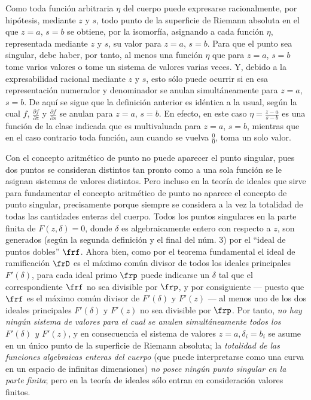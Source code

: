 \documentclass[11pt]{article}
\begin{document}
Como toda función arbitraria \(\eta\) del cuerpo puede expresarse racionalmente, por hipótesis, mediante \(z\) y \(s\), todo punto de la superficie de Riemann absoluta en el que \(z=a\), \(s=b\) se obtiene, por la isomorfía, asignando a cada función \(\eta\), representada mediante \(z\) y \(s\), su valor para \(z=a\), \(s=b\). Para que el punto sea singular, debe haber, por tanto, al menos una función \(\eta\) que para \(z=a\), \(s=b\) tome varios valores o tome un sistema de valores varias veces. Y, debido a la expresabilidad racional mediante \(z\) y \(s\), esto sólo puede ocurrir si en esa representación numerador y denominador se anulan simultáneamente para \(z=a\), \(s=b\). De aquí se sigue que la definición anterior es idéntica a la usual, según la cual \(f\), \(\frac{\partial f}{\partial z}\) y \(\frac{\partial f}{\partial s}\) se anulan para \(z=a\), \(s=b\). En efecto, en este caso \(\eta=\frac{z-a}{s-b}\) es una función de la clase indicada que es multivaluada para \(z=a\), \(s=b\), mientras que en el caso contrario toda función, aun cuando se vuelva \(\frac{0}{0}\), toma un solo valor.

Con el concepto aritmético de punto no puede aparecer el punto singular, pues dos puntos se consideran distintos tan pronto como a una sola función se le asignan sistemas de valores distintos. Pero incluso en la teoría de ideales que sirve para fundamentar el concepto aritmético de punto no aparece el concepto de punto singular, precisamente porque siempre se considera a la vez la totalidad de todas las cantidades enteras del cuerpo. Todos los puntos singulares en la parte finita de \(F(z,\delta)=0\), donde \(\delta\) es algebraicamente entero con respecto a \(z\), son generados (según la segunda definición y el final del núm. 3) por el ``ideal de puntos dobles'' \(\frf\). Ahora bien, como por el teorema fundamental el ideal de ramificación \(\frD\) es el máximo común divisor de todos los ideales principales \(F'(\delta)\), para cada ideal primo \(\frp\) puede indicarse un \(\delta\) tal que el correspondiente \(\frf\) no sea divisible por \(\frp\), y por consiguiente --- puesto que \(\frf\) es el máximo común divisor de \(F'(\delta)\) y \(F'(z)\) --- al menos uno de los dos ideales principales \(F'(\delta)\) y \(F'(z)\) no sea divisible por \(\frp\). Por tanto, \emph{no hay ningún sistema de valores para el cual se anulen simultáneamente todos los \(F'(\delta)\) y \(F'(z)\)}, y en consecuencia el sistema de valores \(z=a,\delta_i=b_i\) se asume en un único punto de la superficie de Riemann absoluta; la \emph{totalidad de las funciones algebraicas enteras del cuerpo} (que puede interpretarse como una curva en un espacio de infinitas dimensiones) \emph{no posee ningún punto singular en la parte finita}; pero en la teoría de ideales sólo entran en consideración valores finitos.
\end{document}
